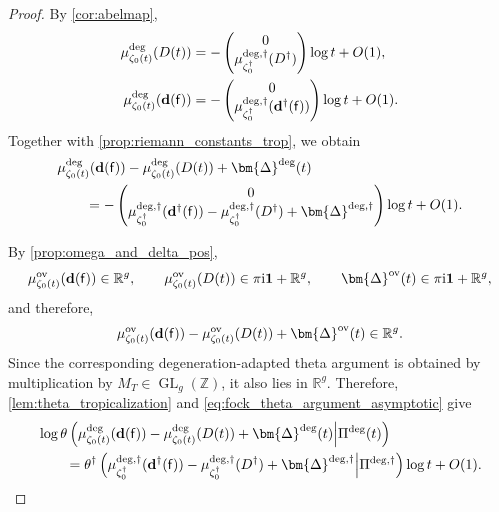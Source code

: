 \documentclass[12pt]{amsart}
\numberwithin{equation}{section}
\theoremstyle{definition}
\newcommand{\Z}{\mathbb{Z}}
\newcommand{\R}{\mathbb{R}}
\def\divisor{D}
\def\trop{\dagger}
\def\imunit{{\mathrm{i}}}
\def\bface{\mathsf{f}}
\def\dam{{\bf d}}
\def\onebf{\mathbf{1}}
\def\divisor{D}
\def\vecRC{\bm{\Delta}}
\def\ptSig{\zeta}
\def\basept{{\ptSig_0}}
\def\baseptT{{\ptSig_0^\trop}}
\begin{document}
\begin{proof}
By \cref{cor:abelmap}, 
\begin{align*}
\mu_{\basept(t)}^{\mathrm{deg}}(\divisor(t))
&=
-
\begin{pmatrix}
0\\
\mu_{\baseptT}^{\mathrm{deg},\trop}(\divisor^\trop)
\end{pmatrix}
\log t
+
O(1),\\
\mu_{\basept(t)}^{\mathrm{deg}}(\dam(\bface))
&=
-
\begin{pmatrix}
0\\
\mu_{\baseptT}^{\mathrm{deg},\trop}
    (\dam^\trop(\bface))
\end{pmatrix}
\log t
+
O(1).
\end{align*}
Together with \cref{prop:riemann_constants_trop}, we obtain
\begin{equation}
\label{eq:fock_theta_argument_asymptotic}
\begin{aligned}
&\mu_{\basept(t)}^{\mathrm{deg}}(\dam(\bface))
-\mu_{\basept(t)}^{\mathrm{deg}}(\divisor(t))
+\vecRC^{\mathrm{deg}}(t)
\\
&\qquad=
-
\begin{pmatrix}
0\\
\mu_{\baseptT}^{\mathrm{deg},\trop}
    (\dam^\trop(\bface))
-\mu_{\baseptT}^{\mathrm{deg},\trop}
    (\divisor^\trop)
+\vecRC^{\mathrm{deg},\trop}
\end{pmatrix}
\log t
+
O(1).
\end{aligned}
\end{equation}

By \cref{prop:omega_and_delta_pos},
\[
\mu_{\basept(t)}^{\mathrm{ov}}(\dam(\bface))
\in\R^g,
\qquad
\mu_{\basept(t)}^{\mathrm{ov}}(\divisor(t))
\in
\pi\imunit\onebf+\R^g,
\qquad
\vecRC^{\mathrm{ov}}(t)
\in
\pi\imunit\onebf+\R^g,
\]and therefore,
\[
\mu_{\basept(t)}^{\mathrm{ov}}(\dam(\bface))
-
\mu_{\basept(t)}^{\mathrm{ov}}(\divisor(t))
+
\vecRC^{\mathrm{ov}}(t)
\in\R^g.
\]
Since the corresponding degeneration-adapted theta argument is obtained
by multiplication by $M_T\in\operatorname{GL}_g(\Z)$, it also lies in
$\R^g$. Therefore, \cref{lem:theta_tropicalization} and
\eqref{eq:fock_theta_argument_asymptotic} give
\begin{equation}
\label{eq:theta_fock_asymptotic}
\begin{aligned}
&\log\theta\left(
\mu_{\basept(t)}^{\mathrm{deg}}(\dam(\bface))
-\mu_{\basept(t)}^{\mathrm{deg}}(\divisor(t))
+\vecRC^{\mathrm{deg}}(t)
\middle|
\Pi^{\mathrm{deg}}(t)
\right)
\\
&\qquad=
\theta^\trop\left(
\mu_{\baseptT}^{\mathrm{deg},\trop}
    (\dam^\trop(\bface))
-\mu_{\baseptT}^{\mathrm{deg},\trop}
    (\divisor^\trop)
+\vecRC^{\mathrm{deg},\trop}
\middle|
\Pi^{\mathrm{deg},\trop}
\right)
\log t
+
O(1).
\end{aligned}
\end{equation}


\end{proof}
\end{document}

